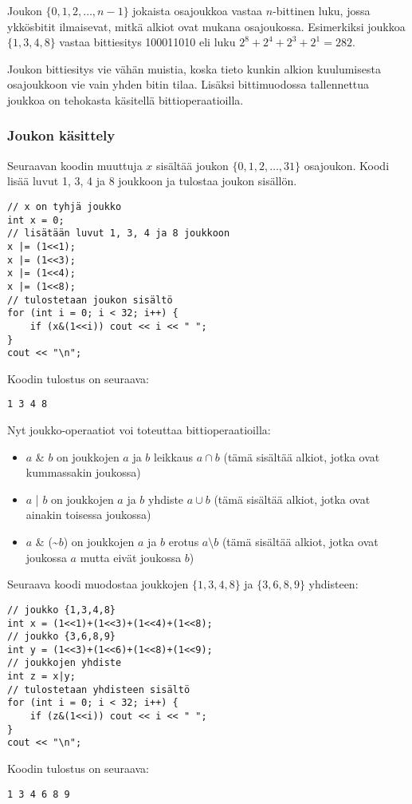Joukon $\{0,1,2,\ldots,n-1\}$
jokaista osajoukkoa
vastaa $n$-bittinen luku,
jossa ykkösbitit ilmaisevat,
mitkä alkiot ovat mukana osajoukossa.
Esimerkiksi joukkoa $\{1,3,4,8\}$
vastaa bittiesitys 100011010 eli luku
$2^8+2^4+2^3+2^1=282$.

Joukon bittiesitys vie vähän muistia,
koska tieto kunkin alkion kuulumisesta
osajoukkoon vie vain yhden bitin tilaa.
Lisäksi bittimuodossa tallennettua joukkoa
on tehokasta käsitellä bittioperaatioilla.

\subsubsection{Joukon käsittely}

Seuraavan koodin muuttuja $x$
sisältää joukon $\{0,1,2,\ldots,31\}$
osajoukon.
Koodi lisää luvut 1, 3, 4 ja 8
joukkoon ja tulostaa
joukon sisällön.

\begin{lstlisting}
// x on tyhjä joukko
int x = 0;
// lisätään luvut 1, 3, 4 ja 8 joukkoon
x |= (1<<1);
x |= (1<<3);
x |= (1<<4);
x |= (1<<8);
// tulostetaan joukon sisältö
for (int i = 0; i < 32; i++) {
    if (x&(1<<i)) cout << i << " ";
}
cout << "\n";
\end{lstlisting}
Koodin tulostus on seuraava:
\begin{lstlisting}
1 3 4 8
\end{lstlisting}

\noindent
Nyt joukko-operaatiot voi toteuttaa bittioperaatioilla:
\begin{itemize}
\item $a$ \& $b$ on joukkojen $a$ ja $b$ leikkaus $a \cap b$
(tämä sisältää alkiot,
jotka ovat kummassakin joukossa)
\item $a$ | $b$ on joukkojen $a$ ja $b$ yhdiste $a \cup b$
(tämä sisältää alkiot,
jotka ovat ainakin toisessa joukossa)
\item $a$ \& (\textasciitilde$b$) on joukkojen $a$ ja $b$ erotus
$a \setminus b$ (tämä sisältää alkiot,
jotka ovat joukossa $a$ mutta eivät joukossa $b$)
\end{itemize}

\noindent
Seuraava koodi muodostaa
joukkojen $\{1,3,4,8\}$ ja $\{3,6,8,9\}$ yhdisteen:

\begin{lstlisting}
// joukko {1,3,4,8}
int x = (1<<1)+(1<<3)+(1<<4)+(1<<8);
// joukko {3,6,8,9}
int y = (1<<3)+(1<<6)+(1<<8)+(1<<9);
// joukkojen yhdiste
int z = x|y;
// tulostetaan yhdisteen sisältö
for (int i = 0; i < 32; i++) {
    if (z&(1<<i)) cout << i << " ";
}
cout << "\n";
\end{lstlisting}
Koodin tulostus on seuraava:
\begin{lstlisting}
1 3 4 6 8 9
\end{lstlisting}

